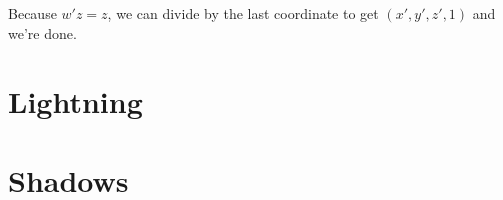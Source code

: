 \documentclass{article}
\begin{document}
Because $w'z = z$, we can divide by the last coordinate to get $(x', y', z', 1)$ and we're done.

\section{Lightning}

\section{Shadows}
\end{document}
